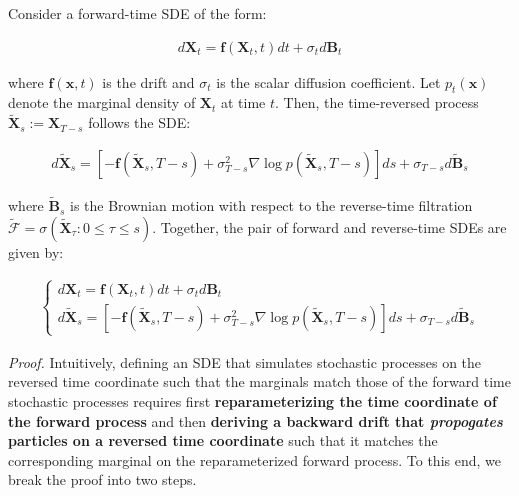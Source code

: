\documentclass{article}
\begin{document}
\begin{proposition}
    Consider a forward-time SDE of the form:
    \begin{small}
    \begin{align}
        d\boldsymbol{X}_t=\boldsymbol{f}(\boldsymbol{X}_t,t) dt+ \sigma_td\boldsymbol{B}_t
    \end{align}
    \end{small}
    where $\boldsymbol{f}(\boldsymbol{x},t)$ is the drift and $\sigma_t$ is the scalar diffusion coefficient. Let $p_t(\boldsymbol{x})$ denote the marginal density of $\boldsymbol{X}_t$ at time $t$. Then, the time-reversed process $\tilde{\boldsymbol{X}}_s:=\boldsymbol{X}_{T-s}$ follows the SDE:
    \begin{small}
    \begin{align}
        d\tilde{\boldsymbol{X}}_s=\left[-\boldsymbol{f}(\tilde{\boldsymbol{X}}_s,T-s)+\sigma_{T-s}^2\nabla\log p(\tilde{\boldsymbol{X}}_s,T-s)\right]ds+\sigma_{T-s}d\widetilde{\boldsymbol{B}}_s
    \end{align}
    \end{small}
    where $\tilde{\boldsymbol{B}}_s$ is the Brownian motion with respect to the reverse-time filtration $\tilde{\mathcal{F}}=\sigma(\tilde{\boldsymbol{X}}_\tau:0\leq \tau \leq s)$. Together, the pair of forward and reverse-time SDEs are given by:  
    \begin{small}
    \begin{align}
        \begin{cases}
            d\boldsymbol{X}_t=\boldsymbol{f}(\boldsymbol{X}_t,t) dt+ \sigma_td\boldsymbol{B}_t\\
            d\tilde{\boldsymbol{X}}_s=\left[-\boldsymbol{f}(\tilde{\boldsymbol{X}}_s,T-s)+\sigma_{T-s}^2\nabla\log p(\tilde{\boldsymbol{X}}_s,T-s)\right]ds+\sigma_{T-s}d\widetilde{\boldsymbol{B}}_s
        \end{cases}\tag{Time Reversal Formula}\label{eq:time-rev-forward-back-sde}
    \end{align}
    \end{small}
\end{proposition}
\textit{Proof.} Intuitively, defining an SDE that simulates stochastic processes on the reversed time coordinate such that the marginals match those of the forward time stochastic processes requires first \textbf{reparameterizing the time coordinate of the forward process} and then \textbf{deriving a backward drift that \textit{propogates} particles on a reversed time coordinate} such that it matches the corresponding marginal on the reparameterized forward process. To this end, we break the proof into two steps.
\end{document}
